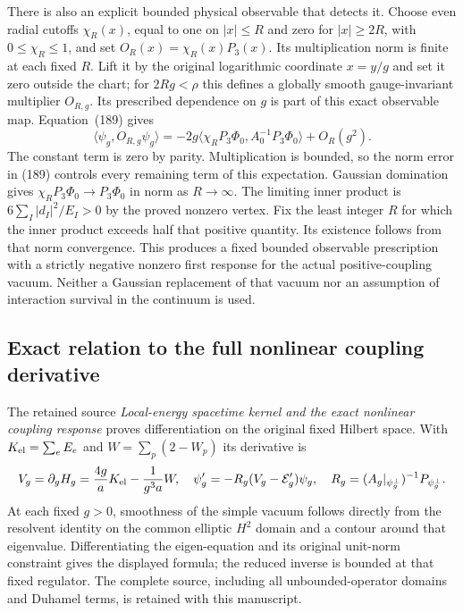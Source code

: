 \documentclass[11pt]{article}
\begin{document}
There is also an explicit bounded physical observable that detects it.
Choose even radial cutoffs $\chi_R(x)$, equal to one on $|x|\le R$
and zero for $|x|\ge2R$, with $0\le\chi_R\le1$, and set
$O_R(x)=\chi_R(x)P_3(x)$. Its multiplication norm is finite at
each fixed $R$. Lift it by the original logarithmic coordinate
$x=y/g$ and set it zero outside the chart; for $2Rg<\rho$ this
defines a globally smooth gauge-invariant multiplier $O_{R,g}$.
Its prescribed dependence on $g$ is part of this exact observable
map. Equation~(189) gives
\begin{equation}\label{eq:vertex-observable-response}
 \langle\psi_g,O_{R,g}\psi_g\rangle
   =-2g\langle\chi_RP_3\Phi_0,A_0^{-1}P_3\Phi_0\rangle+O_R(g^2).
\end{equation}
The constant term is zero by parity. Multiplication is bounded, so
the norm error in (189) controls every
remaining term of this expectation. Gaussian domination gives
$\chi_RP_3\Phi_0\to P_3\Phi_0$ in norm as $R\to\infty$.
The limiting inner product is
$6\sum_I|d_I|^2/E_I>0$ by the proved nonzero vertex. Fix the least
integer $R$ for which the inner product exceeds half that positive
quantity. Its existence follows from that norm convergence. This
produces a fixed bounded observable prescription with a strictly
negative nonzero first response for the actual positive-coupling
vacuum. Neither a Gaussian replacement of that vacuum nor an
assumption of interaction survival in the continuum is used.

\subsection{Exact relation to the full nonlinear coupling derivative}

The retained source \emph{Local-energy spacetime kernel and the exact
nonlinear coupling response} proves differentiation on the original
fixed Hilbert space. With $K_{\rm el}=\sum_eE_e$ and
$W=\sum_p(2-W_p)$ its derivative is
\[
 V_g=\partial_gH_g=\frac{4g}{a}K_{\rm el}-\frac1{g^3a}W,
 \quad \psi'_g=-R_g(V_g-\mathcal E'_g)\psi_g,
 \quad R_g=(A_g|_{\psi_g^\perp})^{-1}P_{\psi_g^\perp}.
\]
At each fixed $g>0$, smoothness of the simple vacuum follows directly
from the resolvent identity on the common elliptic $H^2$ domain and
a contour around that eigenvalue. Differentiating the eigen-equation
and its original unit-norm constraint gives the displayed formula;
the reduced inverse is bounded at that fixed regulator. The complete
source, including all unbounded-operator domains and Duhamel terms,
is retained with this manuscript.
\end{document}
